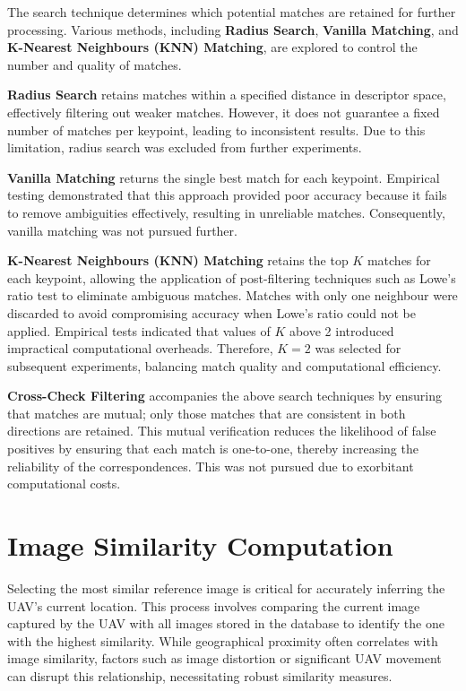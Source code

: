 The search technique determines which potential matches are retained for further processing. Various methods, including \textbf{Radius Search}, \textbf{Vanilla Matching}, and \textbf{K-Nearest Neighbours (KNN) Matching}, are explored to control the number and quality of matches.

\textbf{Radius Search} retains matches within a specified distance in descriptor space, effectively filtering out weaker matches. However, it does not guarantee a fixed number of matches per keypoint, leading to inconsistent results. Due to this limitation, radius search was excluded from further experiments.

\textbf{Vanilla Matching} returns the single best match for each keypoint. Empirical testing demonstrated that this approach provided poor accuracy because it fails to remove ambiguities effectively, resulting in unreliable matches. Consequently, vanilla matching was not pursued further.

\textbf{K-Nearest Neighbours (KNN) Matching} retains the top \( K \) matches for each keypoint, allowing the application of post-filtering techniques such as Lowe’s ratio test to eliminate ambiguous matches. Matches with only one neighbour were discarded to avoid compromising accuracy when Lowe’s ratio could not be applied. Empirical tests indicated that values of \( K \) above 2 introduced impractical computational overheads. Therefore, \( K=2 \) was selected for subsequent experiments, balancing match quality and computational efficiency.

\textbf{Cross-Check Filtering} accompanies the above search techniques by ensuring that matches are mutual; only those matches that are consistent in both directions are retained. This mutual verification reduces the likelihood of false positives by ensuring that each match is one-to-one, thereby increasing the reliability of the correspondences. This was not pursued due to exorbitant computational costs.


\section{Image Similarity Computation}

Selecting the most similar reference image is critical for accurately inferring the UAV's current location. This process involves comparing the current image captured by the UAV with all images stored in the database to identify the one with the highest similarity. While geographical proximity often correlates with image similarity, factors such as image distortion or significant UAV movement can disrupt this relationship, necessitating robust similarity measures.

